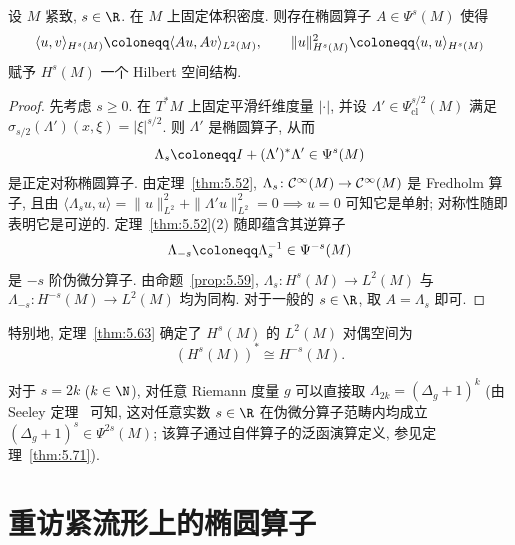\begin{proposition}[$H^s(M)$ 作为 Hilbert 空间]\label{prop:5.64}
设 $M$ 紧致, $s \in \R$. 在 $M$ 上固定体积密度. 则存在椭圆算子 $A \in \Psi^s(M)$ 使得
\begin{equation}\label{eq:5.151}
    \langle u, v \rangle_{H^s(M)} \defeq \langle A u, A v \rangle_{L^2(M)}, \qquad \|u\|_{H^s(M)}^2 \defeq \langle u, u \rangle_{H^s(M)}
\end{equation}
赋予 $H^s(M)$ 一个 Hilbert 空间结构.
\end{proposition}

\begin{proof}
先考虑 $s \ge 0$. 在 $T^* M$ 上固定平滑纤维度量 $|\cdot|$, 并设 $\Lambda' \in \Psi_{\mathrm{cl}}^{s/2}(M)$ 满足 $\sigma_{s/2}(\Lambda')(x, \xi) = |\xi|^{s/2}$. 则 $\Lambda'$ 是椭圆算子, 从而
\begin{equation}\label{eq:5.152}
    \Lambda_s \defeq I + (\Lambda')^* \Lambda' \in \Psi^s(M)
\end{equation}
是正定对称椭圆算子. 由定理~\ref{thm:5.52}, $\Lambda_s \colon \mathcal{C}^\infty(M) \to \mathcal{C}^\infty(M)$ 是 Fredholm 算子, 且由 $\langle \Lambda_s u, u \rangle = \|u\|_{L^2}^2 + \|\Lambda' u\|_{L^2}^2 = 0 \implies u = 0$ 可知它是单射; 对称性随即表明它是可逆的. 定理~\ref{thm:5.52}(2) 随即蕴含其逆算子
\begin{equation}\label{eq:5.153}
    \Lambda_{-s} \defeq \Lambda_s^{-1} \in \Psi^{-s}(M)
\end{equation}
是 $-s$ 阶伪微分算子. 由命题~\ref{prop:5.59}, $\Lambda_s \colon H^s(M) \to L^2(M)$ 与 $\Lambda_{-s} \colon H^{-s}(M) \to L^2(M)$ 均为同构. 对于一般的 $s \in \R$, 取 $A = \Lambda_s$ 即可.
\end{proof}

特别地, 定理~\ref{thm:5.63} 确定了 $H^s(M)$ 的 $L^2(M)$ 对偶空间为
\begin{equation}\label{eq:5.154}
    (H^s(M))^* \cong H^{-s}(M).
\end{equation}

\begin{remark}[$H^{2k}(M)$ 空间的情形]\label{rem:5.65}
对于 $s = 2k$ ($k \in \N$), 对任意 Riemann 度量 $g$ 可以直接取 $\Lambda_{2k} = (\Delta_g + 1)^k$ (由 Seeley 定理~\cite{See67} 可知, 这对任意实数 $s \in \R$ 在伪微分算子范畴内均成立 $(\Delta_g + 1)^s \in \Psi^{2s}(M)$; 该算子通过自伴算子的泛函演算定义, 参见定理~\ref{thm:5.71}).
\end{remark}

\section{重访紧流形上的椭圆算子}\label{sec:5.11}
%
%

